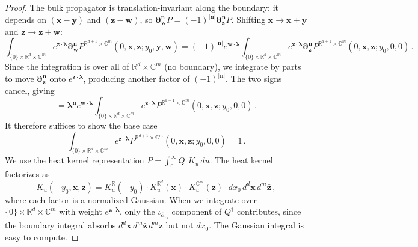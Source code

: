 \documentclass[11pt]{article}
\newcommand{\C}{\mathbb{C}}
\newcommand{\R}{\mathbb{R}}
\numberwithin{equation}{section}
\begin{document}
\begin{proof}
The bulk propagator is translation-invariant along the boundary: it depends on $(\boldsymbol{x}-\boldsymbol{y})$ and $(\boldsymbol{z}-\boldsymbol{w})$, so $\boldsymbol{\partial}_{\boldsymbol{w}}^{\boldsymbol{n}} P = (-1)^{|\boldsymbol{n}|}\boldsymbol{\partial}_{\boldsymbol{z}}^{\boldsymbol{n}} P$. Shifting $\boldsymbol{x}\to \boldsymbol{x}+\boldsymbol{y}$ and $\boldsymbol{z}\to \boldsymbol{z}+\boldsymbol{w}$:
\begin{equation}
	\int_{\{0\}\times\R^d \times \C^m}  e^{\boldsymbol{z}\cdot\boldsymbol{\lambda}}\boldsymbol{\partial}_{\boldsymbol{w}}^{\boldsymbol{n}}P^{\R^{d+1}\times\C^m}(0,\boldsymbol{x},\boldsymbol{z};y_0,\boldsymbol{y},\boldsymbol{w}) = (-1)^{|\boldsymbol{n}|}e^{\boldsymbol{w}\cdot\boldsymbol{\lambda}} \int_{\{0\}\times\R^d \times \C^m}  e^{\boldsymbol{z}\cdot\boldsymbol{\lambda}}\boldsymbol{\partial}_{\boldsymbol{z}}^{\boldsymbol{n}}P^{\R^{d+1}\times\C^m}(0,\boldsymbol{x},\boldsymbol{z};y_0,0,0)\,.
\end{equation}
Since the integration is over all of $\R^d\times\C^m$ (no boundary), we integrate by parts to move $\boldsymbol{\partial}_{\boldsymbol{z}}^{\boldsymbol{n}}$ onto $e^{\boldsymbol{z}\cdot\boldsymbol{\lambda}}$, producing another factor of $(-1)^{|\boldsymbol{n}|}$. The two signs cancel, giving
\begin{equation}
	= \boldsymbol{\lambda}^{\boldsymbol{n}} e^{\boldsymbol{w}\cdot\boldsymbol{\lambda}} \int_{\{0\}\times\R^d \times \C^m}  e^{\boldsymbol{z}\cdot\boldsymbol{\lambda}}P^{\R^{d+1}\times\C^m}(0,\boldsymbol{x},\boldsymbol{z};y_0,0,0)\,.
\end{equation}
It therefore suffices to show the base case
\begin{equation}\label{eq:full_space_base}
	\int_{\{0\}\times\R^d \times \C^m}  e^{\boldsymbol{z}\cdot\boldsymbol{\lambda}}P^{\R^{d+1}\times\C^m}(0,\boldsymbol{x},\boldsymbol{z};y_0,0,0) = 1\,.
\end{equation}
We use the heat kernel representation $P = \int_0^\infty Q^{\dagger} K_u\, du$. The heat kernel factorizes as
\begin{equation}
	K_u(-y_0,\boldsymbol{x},\boldsymbol{z}) = K^{\R}_u(-y_0)\cdot K^{\R^d}_u(\boldsymbol{x})\cdot K^{\C^m}_u(\boldsymbol{z})\cdot dx_0\,d^d\boldsymbol{x}\,d^m\bar{\boldsymbol{z}}\,,
\end{equation}
where each factor is a normalized Gaussian. When we integrate over $\{0\}\times\R^d\times\C^m$ with weight $e^{\boldsymbol{z}\cdot\boldsymbol{\lambda}}$, only the $\iota_{\partial_{x_0}}$ component of $Q^{\dagger}$ contributes, since the boundary integral absorbs $d^d\boldsymbol{x}\,d^m\bar{\boldsymbol{z}}\,d^m\boldsymbol{z}$ but not $dx_0$. The Gaussian integral is easy to compute.

\end{proof}
\end{document}

